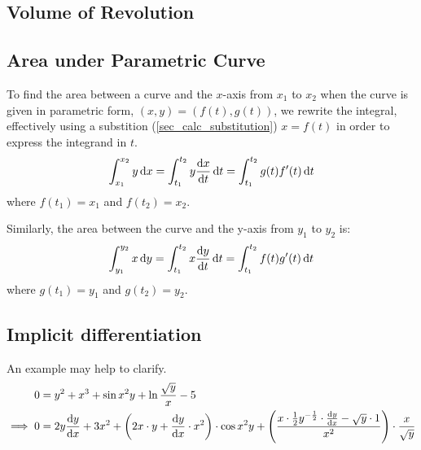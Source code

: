 \documentclass[fleqn,a4paper,11pt]{article}
\begin{document}
    \subsection{Volume of Revolution}

    \subsection{Area under Parametric Curve} \label{sec_calc_parametric_area}

    To find the area between a curve and the \(x\)-axis from \(x_1\) to \(x_2\)
    when the curve is given in parametric form, \((x, y) = (f(t), g(t))\),
    we rewrite the integral, effectively using a substition
    (\ref{sec_calc_substitution}) \(x = f(t)\) in order to express the integrand
    in \(t\).
    \begin{equation}
    \int_{x_1}^{x_2} y \dd{x} =
     \int_{t_1}^{t_2} y \dv{x}{t} \dd{t} =
     \int_{t_1}^{t_2} g(t)f'(t) \dd{t}
    \end{equation}
    where \(f(t_1) = x_1\) and \(f(t_2) = x_2\).

    Similarly, the area between the curve and the y-axis from \(y_1\) to \(y_2\)
    is:
    \begin{equation}
    \int_{y_1}^{y_2} x \dd{y} =
     \int_{t_1}^{t_2} x \dv{y}{t} \dd{t} =
     \int_{t_1}^{t_2} f(t)g'(t) \dd{t}
    \end{equation}
    where \(g(t_1) = y_1\) and \(g(t_2) = y_2\).

    \subsection{Implicit differentiation}



    An example may help to clarify.
    \begin{align*}
    0 &= y^2 + x^3 + \sin x^2 y + \ln \frac{\sqrt y} x - 5 \\
    \implies 0 &=
                2y \dv{y}{x} + 3x^2 +
                \pqty{2x \cdot y + \dv{y}{x} \cdot x^2} \cdot \cos x^2 y +
                \pqty{\frac{x \cdot \frac 12 y^{-\frac 12} \cdot \dv{y}{x} -
                            \sqrt y \cdot 1}
                           {x^2}} \cdot \frac{x}{\sqrt y} \\
    \end{align*}

\end{document}
